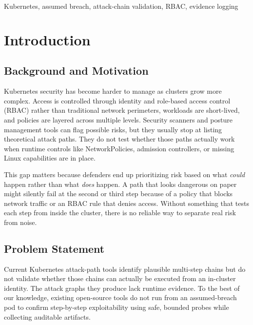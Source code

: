 \documentclass[conference]{IEEEtran}
\begin{document}
\begin{IEEEkeywords}
Kubernetes, assumed breach, attack-chain validation, RBAC, evidence logging
\end{IEEEkeywords}

\section{Introduction}

\subsection{Background and Motivation}
Kubernetes security has become harder to manage as clusters grow more complex. Access is controlled through identity and role-based access control (RBAC) rather than traditional network perimeters, workloads are short-lived, and policies are layered across multiple levels. Security scanners and posture management tools can flag possible risks, but they usually stop at listing theoretical attack paths. They do not test whether those paths actually work when runtime controls like NetworkPolicies, admission controllers, or missing Linux capabilities are in place.

This gap matters because defenders end up prioritizing risk based on what \emph{could} happen rather than what \emph{does} happen. A path that looks dangerous on paper might silently fail at the second or third step because of a policy that blocks network traffic or an RBAC rule that denies access. Without something that tests each step from inside the cluster, there is no reliable way to separate real risk from noise.

\subsection{Problem Statement}
Current Kubernetes attack-path tools identify plausible multi-step chains but do not validate whether those chains can actually be executed from an in-cluster identity. The attack graphs they produce lack runtime evidence. To the best of our knowledge, existing open-source tools do not run from an assumed-breach pod to confirm step-by-step exploitability using safe, bounded probes while collecting auditable artifacts.
\end{document}
